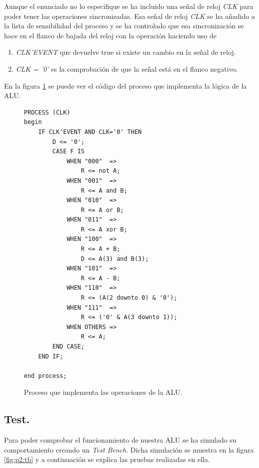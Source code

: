 \documentclass{article}
\begin{document}
Aunque el enunciado no lo especifique se ha incluido una señal de reloj \emph{CLK} para poder tener las operaciones sincronizadas. Esa señal de reloj \emph{CLK} se ha añadido a la lista de sensibilidad del proceso y se ha controlado que esa sincronización se hace en el flanco de bajada del reloj con la operación haciendo uso de
\begin{enumerate}
	\item \emph{CLK'EVENT} que devuelve true si existe un cambio en la señal de reloj.
	\item \emph{CLK = '0'} es la comprobación de que la señal está en el flanco negativo.
\end{enumerate}
En la figura \ref{cod:p2:process} se puede ver el código del proceso que implementa la lógica de la ALU.

\begin{figure}[h]
	\begin{lstlisting}[style=vhdl]
PROCESS (CLK)
begin
	IF CLK'EVENT AND CLK='0' THEN
		D <= '0';
		CASE F IS
			WHEN "000"  =>
				R <= not A;
			WHEN "001"  => 
				R <= A and B;
			WHEN "010"  =>
				R <= A or B;
			WHEN "011"  =>
				R <= A xor B;
			WHEN "100"  =>
				R <= A + B;
				D <= A(3) and B(3);
			WHEN "101"  => 
				R <= A - B;
			WHEN "110"  =>
				R <= (A(2 downto 0) & '0');
			WHEN "111"  =>
				R <= ('0' & A(3 downto 1));
			WHEN OTHERS =>
				R <= A;
		END CASE;
	END IF;

end process;
	\end{lstlisting}
	\caption{Proceso que implementa las operaciones de la ALU.}
	\label{cod:p2:process}
\end{figure}

\subsection{Test.}

Para poder comprobar el funcionamiento de nuestra ALU se ha simulado su comportamiento creando un \emph{Test Bench}. Dicha simulación se muestra en la figura \ref{fig:p2:tb} y a continuación se explica las pruebas realizadas en ella.
\end{document}

